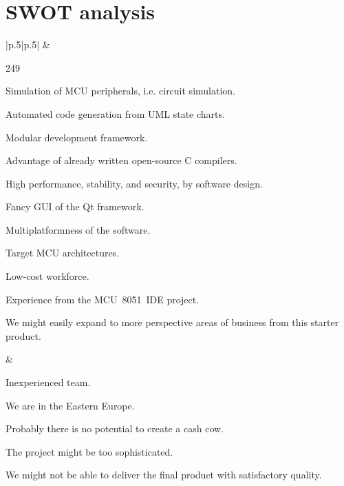 \documentclass[a4paper,twoside,15pt]{book}
\begin{document}
	\section{SWOT analysis}
		\begin{table}[h!]
			\centering{}
			\begin{tabular}{|p{.5\textwidth}|p{}|}
					&  \\

				\begin{dinglist}{249}
					\setlength{\itemsep}{-3pt}
					\item Simulation of MCU peripherals, i.e. circuit simulation.
					\item Automated code generation from UML state charts.
					\item Modular development framework.
					\item Advantage of already written open-source C compilers.
					\item High performance, stability, and security, by software design.
					\item Fancy GUI of the Qt framework.
					\item Multiplatformness of the software.
					\item Target MCU architectures.
					\item Low-cost workforce.
					\item Experience from the MCU~8051~IDE project.
					\item We might easily expand to more perspective areas of business from this starter product.
				\end{dinglist}	&

				\begin{dinglist}{74}
					\setlength{\itemsep}{-3pt}
					\item Inexperienced team.
					\item We are in the Eastern Europe.
					\item Probably there is no potential to create a cash cow.
					\item The project might be too sophisticated.
					\item We might not be able to deliver the final product with satisfactory quality.
				\end{dinglist}	\\


\end{tabular}
\end{table}
\end{document}
